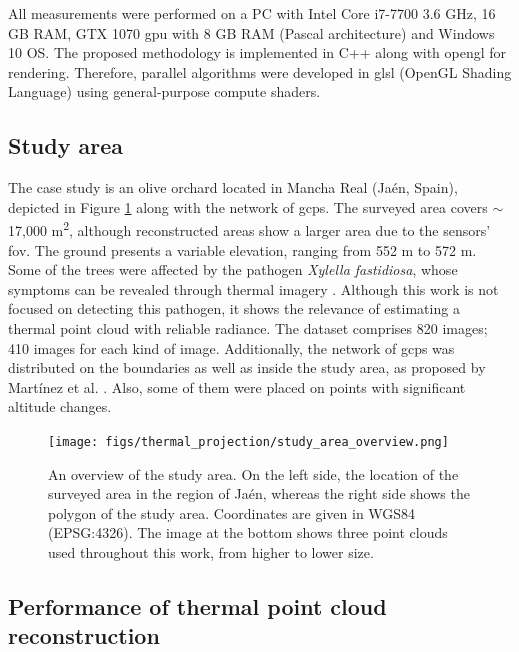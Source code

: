 All measurements were performed on a PC with Intel Core i7-7700 3.6 GHz, 16 GB RAM, GTX 1070 \acrshort{gpu} with 8 GB RAM (Pascal architecture) and Windows 10 OS. The proposed methodology is implemented in C++ along with \acrshort{opengl} for rendering. Therefore, parallel algorithms were developed in \acrshort{glsl} (OpenGL Shading Language) using general-purpose compute shaders. 

\subsection{Study area}

The case study is an olive orchard located in Mancha Real (Jaén, Spain), depicted in Figure \ref{fig:thermal_study_area} along with the network of \acrshort{gcp}s. The surveyed area covers  $\sim$ 17,000 \si{\meter\squared}, although reconstructed areas show a larger area due to the sensors' \acrshort{fov}. The ground presents a variable elevation, ranging from 552 \si{\meter} to 572 \si{\meter}. Some of the trees were affected by the pathogen \textit{Xylella fastidiosa}, whose symptoms can be revealed through thermal imagery \cite{zarco-tejada_previsual_2018}. Although this work is not focused on detecting this pathogen, it shows the relevance of estimating a thermal point cloud with reliable radiance. The dataset comprises 820 images; 410 images for each kind of image. Additionally, the network of \acrshort{gcp}s was distributed on the boundaries as well as inside the study area, as proposed by Martínez et al. \cite{martinez-carricondo_assessment_2018}. Also, some of them were placed on points with significant altitude changes.

\begin{figure}[ht]
    \centering
    \texttt{[image: figs/thermal\_projection/study\_area\_overview.png]}
    \caption{An overview of the study area. On the left side, the location of the surveyed area in the region of Jaén, whereas the right side shows the polygon of the study area. Coordinates are given in WGS84 (EPSG:4326). The image at the bottom shows three point clouds used throughout this work, from higher to lower size. }
	\label{fig:thermal_study_area}
\end{figure}

\subsection{Performance of thermal point cloud reconstruction}

